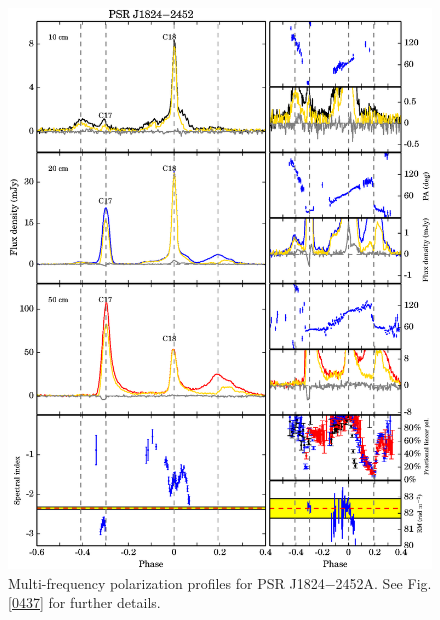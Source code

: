 \documentclass[useAMS,usenatbib]{mn2e}
\begin{document}
\begin{appendices}
\begin{figure}
\begin{center}
\includegraphics[width=6 in]{1824.ps}
\caption{Multi-frequency polarization profiles for PSR J1824$-$2452A. 
See Fig. \ref{0437} for further details.}
\label{1824}
\end{center}
\end{figure}


\end{appendices}
\end{document}
